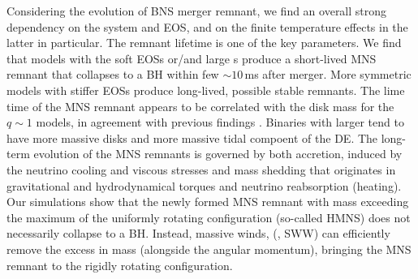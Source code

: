 Considering the \pmerg{} evolution of \ac{BNS} merger remnant, we find an
overall strong dependency on the system \mr{} and \ac{EOS}, and on the 
finite temperature effects in the latter in particular. The remnant lifetime
is one of the key parameters. We find that models with the
soft \acp{EOS} or/and large \mr{}s produce a short-lived \ac{MNS} remnant that 
collapses to a \ac{BH} within few $\sim 10\,$ms after merger. 
%
More symmetric models with stiffer \acp{EOS} produce long-lived, possible 
stable remnants. The lime time of the \ac{MNS} remnant appears to be correlated with the 
disk mass for the $q{\sim}1$ models, in agreement with previous findings 
\citep{Radice:2017lry,Radice:2018pdn}.
Binaries with larger \mr{} tend to have more massive disks and more massive tidal 
compoent of the \ac{DE}.
%
%
The long-term evolution of the \ac{MNS} remnants is governed by both accretion, 
induced by the neutrino cooling and viscous stresses and mass shedding that originates 
in gravitational and hydrodynamical torques and neutrino reabsorption (heating).
Our simulations show that the newly formed \ac{MNS} remnant with mass exceeding the 
maximum of the uniformly rotating configuration (so-called \ac{HMNS}) does 
not necessarily collapse to a \ac{BH}. Instead, massive winds, (\eg, \ac{SWW}) can 
efficiently remove the excess in mass (alongside the angular momentum), bringing 
the \ac{MNS} remnant to the rigidly rotating configuration.
%

